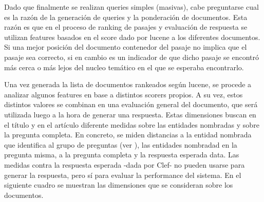 Dado que finalmente se realizan queries simples (masivas), cabe preguntarse cual es la razón de la generación de queries y la ponderación de documentos. Esta razón es que en el proceso de ranking de pasajes y evaluación de respuesta se utilizan features basados en el score dado por lucene a los diferentes documentos. Si una mejor posición del documento contenedor del pasaje no implica que el pasaje sea correcto, si en cambio es un indicador de que dicho pasaje se encontró más cerca o más lejos del nucleo temático en el que se esperaba encontrarlo. 

Una vez generada la lista de documentos rankeados según lucene, se procede a analizar algunos features en base a distintos scorers propios. A su vez, estos distintos valores se combinan en una evaluación general del documento, que será utilizada luego a la hora de generar una respuesta. Estas dimensiones buscan en el título y en el artículo diferente medidas sobre las entidades nombradas y sobre la pregunta completa. En concreto, se miden distancias a la entidad nombrada que identifica al grupo de preguntas (ver ), las entidades nombradad en la pregunta misma, a la pregunta completa y la respuesta esperada data. Las medidas contra la respuesta esperada -dada por Clef- no pueden usarse para generar la respuesta, pero sí para evaluar la performance del sistema. En el siguiente cuadro se muestran las dimensiones que se consideran sobre los documentos. 


